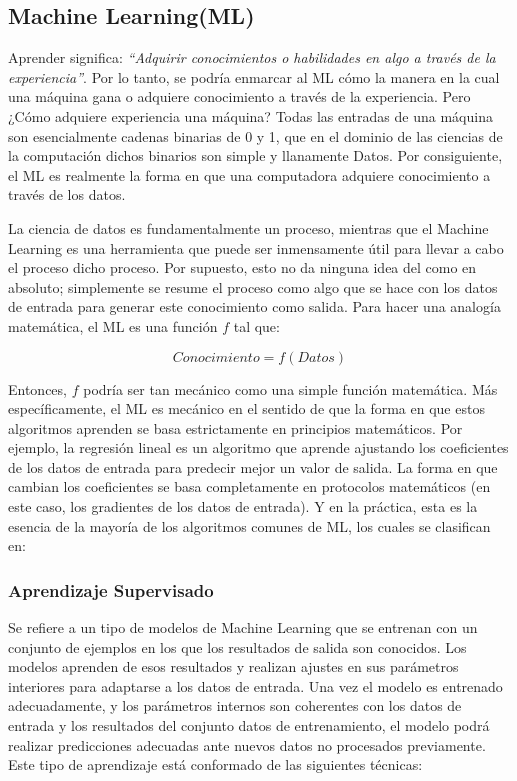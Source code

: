 \subsection{Machine Learning(ML)}
Aprender significa: \textit{“Adquirir conocimientos o habilidades en algo a través de la experiencia”}.  Por lo tanto, se podría enmarcar al ML cómo la manera en la cual una máquina gana o adquiere conocimiento a través de la experiencia. Pero ¿Cómo adquiere experiencia una máquina? Todas las entradas de una máquina son esencialmente cadenas binarias de 0 y 1, que en el dominio de las ciencias de la computación dichos binarios son simple y llanamente Datos. Por consiguiente, el ML es realmente la forma en que una computadora adquiere conocimiento a través de los datos.  

La ciencia de datos es fundamentalmente un proceso, mientras que el Machine Learning es una herramienta que puede ser inmensamente útil para llevar a cabo el proceso dicho proceso\cite{Pillai2020}. Por supuesto, esto no da ninguna idea del como en absoluto; simplemente se resume el proceso como algo que se hace con los datos de entrada para generar este conocimiento como salida. Para hacer una analogía matemática, el ML es una función $f$ tal que:

\begin{equation}
	Conocimiento=f(Datos)
\end{equation}

Entonces, $f$ podría ser tan mecánico como una simple función matemática. Más específicamente, el ML es mecánico en el sentido de que la forma en que estos algoritmos aprenden se basa estrictamente en principios matemáticos. Por ejemplo, la regresión lineal es un algoritmo que aprende ajustando los coeficientes de los datos de entrada para predecir mejor un valor de salida. La forma en que cambian los coeficientes se basa completamente en protocolos matemáticos (en este caso, los gradientes de los datos de entrada)\cite{Pillai2020}. Y en la práctica, esta es la esencia de la mayoría de los algoritmos comunes de ML, los cuales se clasifican en:

\subsubsection{Aprendizaje Supervisado}
Se refiere a un tipo de modelos de Machine Learning que se entrenan con un conjunto de ejemplos en los que los resultados de salida son conocidos. Los modelos aprenden de esos resultados y realizan ajustes en sus parámetros interiores para adaptarse a los datos de entrada. Una vez el modelo es entrenado adecuadamente, y los parámetros internos son coherentes con los datos de entrada y los resultados del conjunto datos de entrenamiento, el modelo podrá realizar predicciones adecuadas ante nuevos datos no procesados previamente\cite{Roman2019}. Este tipo de aprendizaje está conformado de las siguientes técnicas:

